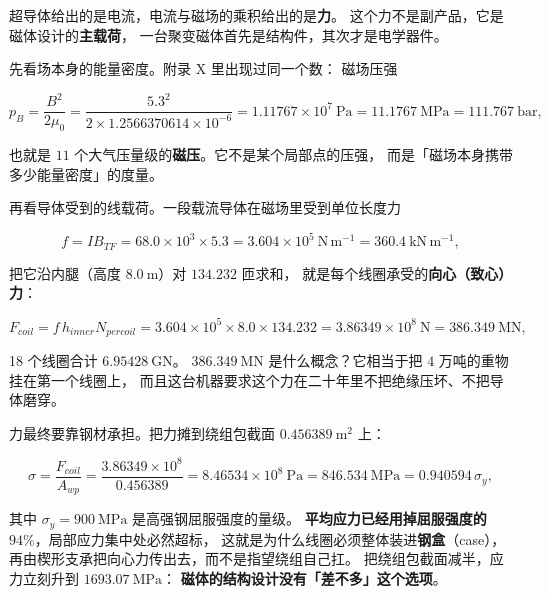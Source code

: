 超导体给出的是电流，电流与磁场的乘积给出的是\textbf{力}。
这个力不是副产品，它是磁体设计的\textbf{主载荷}，
一台聚变磁体首先是结构件，其次才是电学器件。

先看场本身的能量密度。附录 X 里出现过同一个数：
磁场压强

\begin{equation}
p_B=\frac{B^{2}}{2\mu_0}
=\frac{5.3^{2}}{2\times1.2566370614\times10^{-6}}
=1.11767\times10^{7}\ \mathrm{Pa}
=11.1767\ \mathrm{MPa}=111.767\ \mathrm{bar},
\label{eq:app-am-pb}
\end{equation}

也就是 $11$ 个大气压量级的\textbf{磁压}。它不是某个局部点的压强，
而是「磁场本身携带多少能量密度」的度量。

再看导体受到的线载荷。一段载流导体在磁场里受到单位长度力

\begin{equation}
f=IB_{TF}=68.0\times10^{3}\times5.3=3.604\times10^{5}\ \mathrm{N\,m^{-1}}
=360.4\ \mathrm{kN\,m^{-1}},
\label{eq:app-am-florentz}
\end{equation}

把它沿内腿（高度 $8.0\ \mathrm{m}$）对 $134.232$ 匝求和，
就是每个线圈承受的\textbf{向心（致心）力}：

\begin{equation}
F_{coil}=f\,h_{inner}N_{percoil}
=3.604\times10^{5}\times8.0\times134.232
=3.86349\times10^{8}\ \mathrm{N}=386.349\ \mathrm{MN},
\label{eq:app-am-hoop}
\end{equation}

18 个线圈合计 $6.95428\ \mathrm{GN}$。
$386.349\ \mathrm{MN}$ 是什么概念？它相当于把 $4$ 万吨的重物挂在第一个线圈上，
而且这台机器要求这个力在二十年里不把绝缘压坏、不把导体磨穿。

力最终要靠钢材承担。把力摊到绕组包截面 $0.456389\ \mathrm{m^{2}}$ 上：

\begin{equation}
\sigma=\frac{F_{coil}}{A_{wp}}
=\frac{3.86349\times10^{8}}{0.456389}
=8.46534\times10^{8}\ \mathrm{Pa}=846.534\ \mathrm{MPa}
=0.940594\,\sigma_{y},
\label{eq:app-am-stress}
\end{equation}

其中 $\sigma_y=900\ \mathrm{MPa}$ 是高强钢屈服强度的量级。
\textbf{平均应力已经用掉屈服强度的 $94\%$}，局部应力集中处必然超标，
这就是为什么线圈必须整体装进\textbf{钢盒}（case），
再由楔形支承把向心力传出去，而不是指望绕组自己扛。
把绕组包截面减半，应力立刻升到 $1693.07\ \mathrm{MPa}$：
\textbf{磁体的结构设计没有「差不多」这个选项}。

